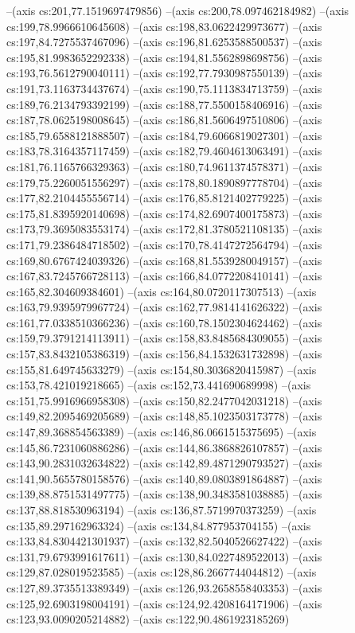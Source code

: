 --(axis cs:201,77.1519697479856)
--(axis cs:200,78.097462184982)
--(axis cs:199,78.9966610645608)
--(axis cs:198,83.0622429973677)
--(axis cs:197,84.7275537467096)
--(axis cs:196,81.6253588500537)
--(axis cs:195,81.9983652292338)
--(axis cs:194,81.5562898698756)
--(axis cs:193,76.5612790040111)
--(axis cs:192,77.7930987550139)
--(axis cs:191,73.1163734437674)
--(axis cs:190,75.1113834713759)
--(axis cs:189,76.2134793392199)
--(axis cs:188,77.5500158406916)
--(axis cs:187,78.0625198008645)
--(axis cs:186,81.5606497510806)
--(axis cs:185,79.6588121888507)
--(axis cs:184,79.6066819027301)
--(axis cs:183,78.3164357117459)
--(axis cs:182,79.4604613063491)
--(axis cs:181,76.1165766329363)
--(axis cs:180,74.9611374578371)
--(axis cs:179,75.2260051556297)
--(axis cs:178,80.1890897778704)
--(axis cs:177,82.2104455556714)
--(axis cs:176,85.8121402779225)
--(axis cs:175,81.8395920140698)
--(axis cs:174,82.6907400175873)
--(axis cs:173,79.3695083553174)
--(axis cs:172,81.3780521108135)
--(axis cs:171,79.2386484718502)
--(axis cs:170,78.4147272564794)
--(axis cs:169,80.6767424039326)
--(axis cs:168,81.5539280049157)
--(axis cs:167,83.7245766728113)
--(axis cs:166,84.0772208410141)
--(axis cs:165,82.304609384601)
--(axis cs:164,80.0720117307513)
--(axis cs:163,79.9395979967724)
--(axis cs:162,77.9814141626322)
--(axis cs:161,77.0338510366236)
--(axis cs:160,78.1502304624462)
--(axis cs:159,79.3791214113911)
--(axis cs:158,83.8485684309055)
--(axis cs:157,83.8432105386319)
--(axis cs:156,84.1532631732898)
--(axis cs:155,81.649745633279)
--(axis cs:154,80.3036820415987)
--(axis cs:153,78.421019218665)
--(axis cs:152,73.441690689998)
--(axis cs:151,75.9916966958308)
--(axis cs:150,82.2477042031218)
--(axis cs:149,82.2095469205689)
--(axis cs:148,85.1023503173778)
--(axis cs:147,89.368854563389)
--(axis cs:146,86.0661515375695)
--(axis cs:145,86.7231060886286)
--(axis cs:144,86.3868826107857)
--(axis cs:143,90.2831032634822)
--(axis cs:142,89.4871290793527)
--(axis cs:141,90.5655780158576)
--(axis cs:140,89.0803891864887)
--(axis cs:139,88.8751531497775)
--(axis cs:138,90.3483581038885)
--(axis cs:137,88.818530963194)
--(axis cs:136,87.5719970373259)
--(axis cs:135,89.297162963324)
--(axis cs:134,84.877953704155)
--(axis cs:133,84.8304421301937)
--(axis cs:132,82.5040526627422)
--(axis cs:131,79.6793991617611)
--(axis cs:130,84.0227489522013)
--(axis cs:129,87.028019523585)
--(axis cs:128,86.2667744044812)
--(axis cs:127,89.3735513389349)
--(axis cs:126,93.2658558403353)
--(axis cs:125,92.6903198004191)
--(axis cs:124,92.4208164171906)
--(axis cs:123,93.0090205214882)
--(axis cs:122,90.4861923185269)

